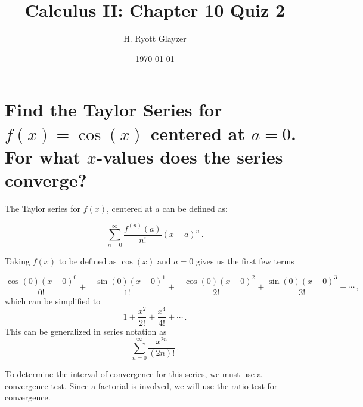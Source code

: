\documentclass[12pt, letterpaper]{article}
\begin{document}
\title{Calculus II\@: Chapter 10 Quiz 2}
\author{H. Ryott Glayzer}
\date{\today}


\maketitle


\section{Find the Taylor Series for $f(x) = \cos{(x)}$ centered at $a=0$.
	For what $x$-values does the series converge?}

The Taylor series for $f(x)$, centered at $a$ can be defined as: 

\begin{equation}
	\sum_{n=0}^{\infty} \frac{f^{(n)}(a)}{n!} {(x-a)}^{n}\,.	
\end{equation}

Taking $f(x)$ to be defined as $\cos{(x)}$ and $a = 0$ gives us the first few terms

\begin{equation}
	\frac{\cos{(0)}{{(x-0)}^{0}}}{0!} +
	\frac{-\sin{(0)}{(x-0)}^{1}}{1!} +
	\frac{-\cos{(0)}{(x-0)}^{2}}{2!} +
	\frac{\sin{(0)}{(x-0)}^{3}}{3!} + \cdots \,,
\end{equation}
which can be simplified to
\begin{equation}
	1 + \frac{x^{2}}{2!} + \frac{x^{4}}{4!} + \cdots \,.
\end{equation}
This can be generalized in series notation as
\begin{equation}
	\sum_{n=0}^{\infty} \frac{x^{2n}}{(2n)!} \,.
\end{equation}

To determine the interval of convergence for this series, we must use
a convergence test.
Since a factorial is involved, we will use the ratio test for convergence.
\end{document}
